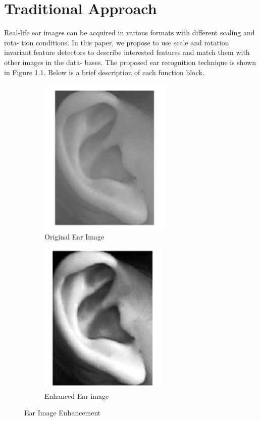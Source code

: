 \section{Traditional Approach} 
Real-life ear images can be acquired in various formats with different scaling and rota- tion conditions. In this paper, we propose to use scale and rotation invariant feature detectors to describe interested features and match them with other images in the data- bases. The proposed ear recognition technique is shown in Figure 1.1. Below is a brief description of each function block.


\begin{figure}
\centering
\begin{subfigure}{.5\textwidth}
  \centering
  \includegraphics[width=.4\linewidth]{Figures/Figure3}
  \caption{Original Ear Image}
  \label{fig:sub1}
\end{subfigure}%
\begin{subfigure}{.5\textwidth}
  \centering
  \includegraphics[width=.4\linewidth]{Figures/Figure4}
  \caption{Enhanced Ear image}
  \label{fig:sub2}
\end{subfigure}
\caption{Ear Image Enhancement}
\label{fig:test}
\end{figure}

